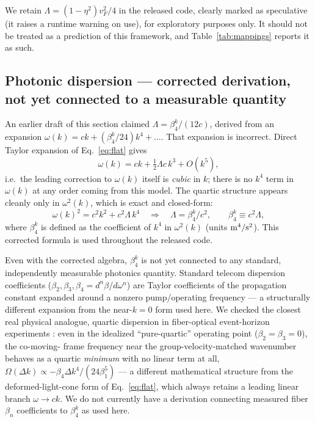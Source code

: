 \documentclass[12pt,a4paper]{article}
\begin{document}
We retain $\Lambda=(1-\eta^2)v_F^2/4$ in the released code, clearly
marked as speculative (it raises a runtime warning on use), for
exploratory purposes only. It should not be treated as a prediction of
this framework, and Table~\ref{tab:mappings} reports it as such.

\subsection{Photonic dispersion --- corrected derivation, not yet
connected to a measurable quantity}

An earlier draft of this section claimed
$\Lambda=\beta_4^k/(12c)$, derived from an expansion
$\omega(k)=ck+(\beta_4^k/24)k^4+\dots$. That expansion is incorrect.
Direct Taylor expansion of Eq.~\eqref{eq:flat} gives
\begin{equation}
  \omega(k) = ck + \tfrac{1}{2}\Lambda c\,k^3 + O(k^5),
\end{equation}
i.e.\ the leading correction to $\omega(k)$ itself is \emph{cubic} in
$k$; there is no $k^4$ term in $\omega(k)$ at any order coming from this
model. The quartic structure appears cleanly only in $\omega^2(k)$,
which is exact and closed-form:
\begin{equation}
  \omega(k)^2 = c^2k^2 + c^2\Lambda\,k^4 \quad\Longrightarrow\quad
  \Lambda = \beta_4^k/c^2, \qquad \beta_4^k \equiv c^2\Lambda,
\end{equation}
where $\beta_4^k$ is defined as the coefficient of $k^4$ in
$\omega^2(k)$ (units ${\rm m^4/s^2}$). This corrected formula is used
throughout the released code.

Even with the corrected algebra, $\beta_4^k$ is not yet connected to any
standard, independently measurable photonics quantity. Standard telecom
dispersion coefficients ($\beta_2,\beta_3,\beta_4=d^n\beta/d\omega^n$)
are Taylor coefficients of the propagation constant expanded around a
nonzero pump/operating frequency --- a structurally different
expansion from the near-$k=0$ form used here. We checked the closest
real physical analogue, quartic dispersion in fiber-optical
event-horizon experiments \citep{Webb2014}: even in the idealized
``pure-quartic'' operating point ($\beta_2=\beta_3=0$), the co-moving-
frame frequency near the group-velocity-matched wavenumber behaves as a
quartic \emph{minimum} with no linear term at all,
$\Omega(\Delta k)\propto-\beta_4\Delta k^4/(24\beta_1^5)$ --- a
different mathematical structure from the deformed-light-cone form of
Eq.~\eqref{eq:flat}, which always retains a leading linear branch
$\omega\to ck$. We do not currently have a derivation connecting
measured fiber $\beta_n$ coefficients to $\beta_4^k$ as used here.
\end{document}
